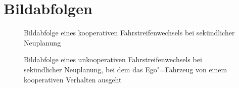 \section{Bildabfolgen}
\label{sec:bildabfolge}

\begin{figure}[!htbp]
    \centering
    \label{fig:abfolgecoop}
    \caption[Bildabfolge kooperativ]{Bildabfolge eines kooperativen Fahrstreifenwechsels bei sek\"undlicher Neuplanung}
\end{figure}


\begin{figure}[!htbp]
    \centering
    \label{fig:abfolgeego}
    \caption[Bildabfolge kooperativ]{Bildabfolge eines unkooperativen Fahrstreifenwechsels bei sek\"undlicher Neuplanung, bei dem das Ego"=Fahrzeug von einem kooperativen Verhalten ausgeht}
\end{figure}


\newpage
